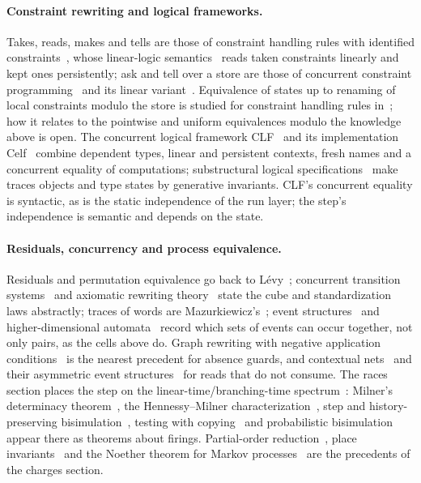 \documentclass[11pt]{article}
\theoremstyle{remark}
\begin{document}
\paragraph{Constraint rewriting and logical frameworks.} Takes, reads, makes and tells are those of
constraint handling rules with identified constraints~\cite{fruehwirth09}, whose linear-logic
semantics~\cite{betzfruehwirth05} reads taken constraints linearly and kept ones persistently; ask and tell over a
store are those of concurrent constraint programming~\cite{saraswat93} and its linear
variant~\cite{fagesruetsoliman01}. Equivalence of states up to renaming of local constraints modulo the store is
studied for constraint handling rules in~\cite{raiser09}; how it relates to the pointwise and uniform
equivalences modulo the knowledge above is open. The concurrent logical framework
CLF~\cite{clf02} and its implementation Celf~\cite{celf08} combine dependent types, linear and persistent
contexts, fresh names and a concurrent equality of computations; substructural logical
specifications~\cite{simmons12} make traces objects and type states by generative invariants.
CLF's concurrent equality is syntactic, as is the static independence of the run layer; the
step's independence is semantic and depends on the state.

\paragraph{Residuals, concurrency and process equivalence.} Residuals and permutation equivalence go
back to L\'evy~\cite{levy78}; concurrent transition systems~\cite{stark89} and axiomatic rewriting
theory~\cite{mellies05} state the cube and standardization laws abstractly; traces of words are
Mazurkiewicz's~\cite{mazurkiewicz87}; event structures~\cite{winskel87} and higher-dimensional
automata~\cite{pratt91,vanglabbeek06} record which sets of events can occur together, not only pairs, as
the cells above do. Graph rewriting with negative application conditions~\cite{habel96} is the nearest
precedent for absence guards, and contextual nets~\cite{montanarirossi95} and their asymmetric event
structures~\cite{baldancorradinimontanari01} for reads that do not consume. The races section places the
step on the linear-time/branching-time spectrum~\cite{vanglabbeek01}: Milner's determinacy
theorem~\cite{milner89}, the Hennessy--Milner characterization~\cite{hennessymilner85}, step and
history-preserving bisimulation~\cite{vanglabbeekgoltz01}, testing with copying~\cite{abramsky87} and
probabilistic bisimulation~\cite{larsenskou91} appear there as theorems about firings. Partial-order
reduction~\cite{godefroid96}, place invariants~\cite{murata89} and the Noether theorem for Markov
processes~\cite{baezfong13} are the precedents of the charges section.
\end{document}

